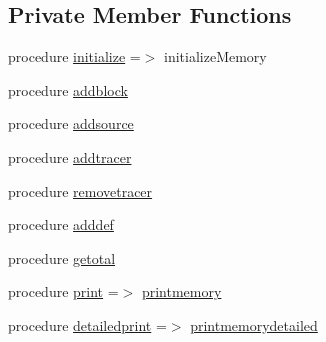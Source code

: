 \subsection*{Private Member Functions}
\begin{DoxyCompactItemize}
\item 
procedure \mbox{\hyperlink{structsimulation__memory__mod_1_1memory__t_aba98543cee9846320a3cb7b522d32525}{initialize}} =$>$ initialize\+Memory
\item 
procedure \mbox{\hyperlink{structsimulation__memory__mod_1_1memory__t_a374c166c7b2412805d1c4e513bdba93b}{addblock}}
\item 
procedure \mbox{\hyperlink{structsimulation__memory__mod_1_1memory__t_a29800fdc8fd46bbe3d3217b2a3fb3da9}{addsource}}
\item 
procedure \mbox{\hyperlink{structsimulation__memory__mod_1_1memory__t_a6ad9a6c98265df362aa17cef6f90e59d}{addtracer}}
\item 
procedure \mbox{\hyperlink{structsimulation__memory__mod_1_1memory__t_a687722de4a78f78599f83afc689b7f8a}{removetracer}}
\item 
procedure \mbox{\hyperlink{structsimulation__memory__mod_1_1memory__t_a911dd049cf53d2ed80069303ddb3ed9e}{adddef}}
\item 
procedure \mbox{\hyperlink{structsimulation__memory__mod_1_1memory__t_a0f8e7d20bb189b7d28b28e45798bb687}{getotal}}
\item 
procedure \mbox{\hyperlink{structsimulation__memory__mod_1_1memory__t_a12a39d94e7e4e9b857d0a5613dd01996}{print}} =$>$ \mbox{\hyperlink{namespacesimulation__memory__mod_a16a7a1c7e88fe5a5523d23f83f0e04a0}{printmemory}}
\item 
procedure \mbox{\hyperlink{structsimulation__memory__mod_1_1memory__t_ac6105b92726abbb5ff671509c7eeea57}{detailedprint}} =$>$ \mbox{\hyperlink{namespacesimulation__memory__mod_a894bd4ec7462fd634d328ee5be4c6483}{printmemorydetailed}}
\end{DoxyCompactItemize}
